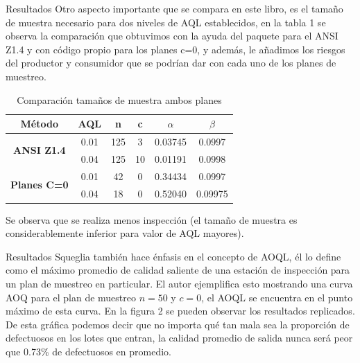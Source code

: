 \documentclass[10pt]{beamer}
\begin{document}
\begin{frame}{Resultados}
Otro aspecto importante que se compara en este libro, es el tamaño de muestra necesario para dos niveles de AQL establecidos, en la tabla 1 se observa la comparación que obtuvimos con la ayuda del paquete \cite{AyR} para el ANSI Z1.4 y con código propio para los planes c=0, y además, le añadimos los riesgos del productor y consumidor que se podrían dar con cada uno de los planes de muestreo.

\begin{table}[htbp]
  \centering
    \begin{tabular}{c|c|c|c|c|c}
    \hline
    \textbf{Método} & \textbf{AQL} & \textbf{n} & \textbf{c} & \textbf{$\alpha$} & \textbf{$\beta$} \\
    \hline
    \multirow{2}[2]{*}{\textbf{ANSI Z1.4}} & 0.01  & 125   & 3     & 0.03745 & 0.0997 \\
          & 0.04  & 125   & 10    & 0.01191 & 0.0998 \\
    \hline
    \multirow{2}[2]{*}{\textbf{Planes C=0}} & 0.01  & 42    & 0     & 0.34434 & 0.0997 \\
          & 0.04  & 18    & 0     & 0.52040 & 0.09975 \\
    \hline
    \end{tabular}%
    \caption{Comparación tamaños de muestra ambos planes}
  \label{tab:addlabel}%
\end{table}%
Se observa que se realiza menos inspección (el tamaño de muestra es considerablemente inferior para valor de AQL mayores). 
\end{frame}

\begin{frame}{Resultados}
Squeglia también hace énfasis en el concepto de AOQL, él lo define como el máximo promedio de calidad saliente de una estación de inspección para un plan de muestreo en particular. El autor ejemplifica esto mostrando una curva AOQ para el plan de muestreo $n=50$ y $c=0$, el AOQL se encuentra en el punto máximo de esta curva. En la figura 2 se pueden observar los resultados replicados. De esta gráfica podemos decir que no importa qué tan mala sea la proporción de defectuosos en los lotes que entran, la calidad promedio de salida nunca será peor que 0.73\% de defectuosos en promedio.
\end{frame}
\end{document}
